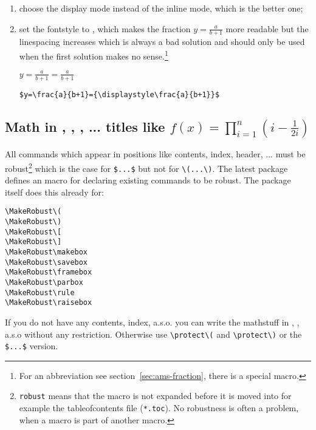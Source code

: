 \begin{enumerate}
\item choose the display mode instead of the inline mode, which is the better
one;
\item set the fontstyle to , which makes
the fraction $y={\displaystyle\frac{a}{b+1}}$ more readable but
the linespacing increases which is always a bad solution and should
only be used when the first solution makes no sense.\footnote{For an abbreviation see
section~\vref{sec:ams-fraction}, there is a special  macro.}

\bigskip
\begin{minipage}{0.25\fullwidth}
$y=\frac{a}{b+1}={\displaystyle\frac{a}{b+1}}$
\end{minipage}\hfill
\begin{minipage}{0.72\fullwidth}
\begin{lstlisting}
$y=\frac{a}{b+1}={\displaystyle\frac{a}{b+1}}$
\end{lstlisting}
\end{minipage}
\end{enumerate}


\subsection[Math in Chapter/Section Titles]{\label{inline-chapter}Math in ,
, ,
... titles like $f(x)=\prod_{i=1}^{n}\left(i-\frac{1}{2i}\right)$}\label{subsec:mathInTitles}

All commands which appear in positions like contents, index, header,
... must be robust\footnote{%
\texttt{robust} means that the macro is not expanded before it is moved
into for example the tableofcontents file (\texttt{*.toc}).  No robustness is 
often a problem, when a macro is part of another macro.}
which is the case for \verb+$...$+ but not for \verb+\(...\)+. 
The latest package  defines an macro for declaring
existing commands to be robust. The package itself does this already for: 

\begin{lstlisting}
\MakeRobust\(
\MakeRobust\)
\MakeRobust\[
\MakeRobust\]
\MakeRobust\makebox
\MakeRobust\savebox
\MakeRobust\framebox
\MakeRobust\parbox
\MakeRobust\rule
\MakeRobust\raisebox
\end{lstlisting}


If you do not have any contents, index, a.s.o.
you can write the mathstuff in , ,
a.s.o without any restriction. Otherwise use \verb+\protect\(+ and \verb+\protect\)+ or the
\verb+$...$+ version.

